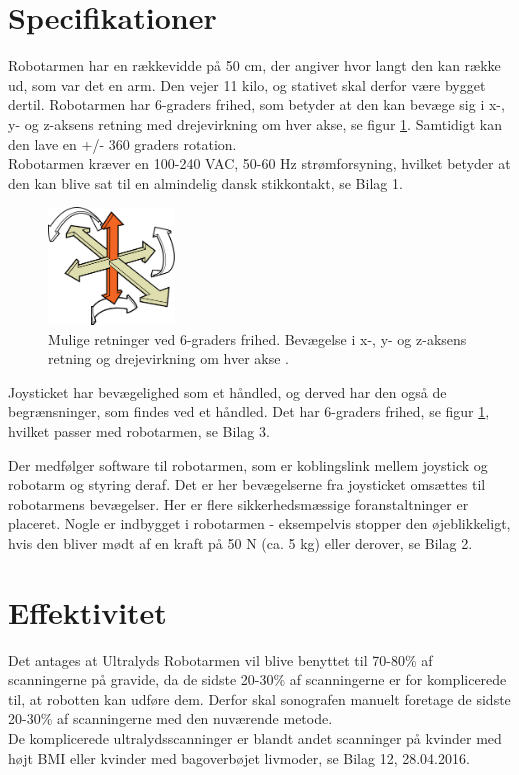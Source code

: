 \section{Specifikationer}
Robotarmen har en rækkevidde på 50 cm, der angiver hvor langt den kan række ud, som var det en arm. Den vejer 11 kilo, og stativet skal derfor være bygget dertil. Robotarmen har 6-graders frihed, som betyder at den kan bevæge sig i x-, y- og z-aksens retning med drejevirkning om hver akse, se figur \ref{seksgradersfrihed}. Samtidigt kan den lave en +/- 360 graders rotation. \\
Robotarmen kræver en 100-240 VAC, 50-60 Hz strømforsyning, hvilket betyder at den kan blive sat til en almindelig dansk stikkontakt, se Bilag 1.
  
\begin{figure}[H]\centering
	\includegraphics[width = 0.3\textwidth]{Figurer/sixDegressOfFreedom.jpg}
	\caption{Mulige retninger ved 6-graders frihed. Bevægelse i x-, y- og z-aksens retning og drejevirkning om hver akse \cite{6gradersfrihed}. }
	\label{seksgradersfrihed}
\end{figure}

Joysticket har bevægelighed som et håndled, og derved har den også de begrænsninger, som findes ved et håndled. Det har 6-graders frihed, se figur \ref{seksgradersfrihed}, hvilket passer med robotarmen, se Bilag 3. 

Der medfølger software til robotarmen, som er koblingslink mellem joystick og robotarm og styring deraf. Det er her bevægelserne fra joysticket omsættes til robotarmens bevægelser. Her er flere sikkerhedsmæssige foranstaltninger er placeret. Nogle er indbygget i robotarmen - eksempelvis stopper den øjeblikkeligt, hvis den bliver mødt af en kraft på 50 N (ca. 5 kg) eller derover, se Bilag 2.    

\section{Effektivitet}
Det antages at Ultralyds Robotarmen vil blive benyttet til 70-80\% af scanningerne på gravide, da de sidste 20-30\% af scanningerne er for komplicerede til, at robotten kan udføre dem. Derfor skal sonografen manuelt foretage de sidste 20-30\% af scanningerne med den nuværende metode. \\ 
De komplicerede ultralydsscanninger er blandt andet scanninger på kvinder med højt BMI eller kvinder med bagoverbøjet livmoder, se Bilag 12, 28.04.2016. 
 
